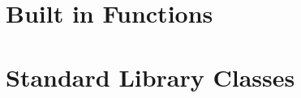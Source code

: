 \begin{homeworkProblem}
	\section{Built in Functions}
	\section{Standard Library Classes}

\end{homeworkProblem}
